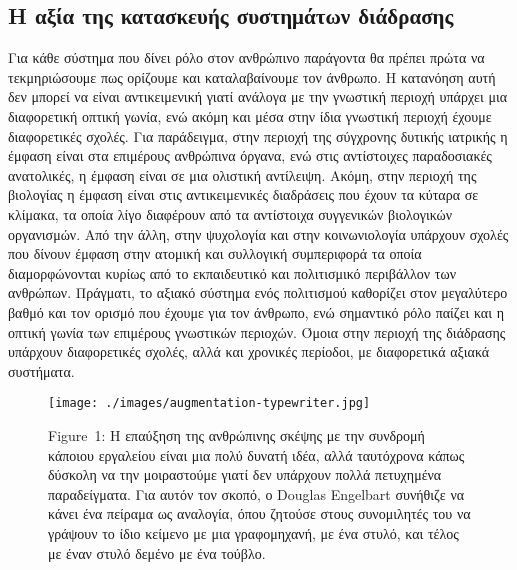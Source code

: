 \documentclass[
]{article}
\begin{document}
\hypertarget{ux3b7-ux3b1ux3beux3afux3b1-ux3c4ux3b7ux3c2-ux3baux3b1ux3c4ux3b1ux3c3ux3baux3b5ux3c5ux3aeux3c2-ux3c3ux3c5ux3c3ux3c4ux3b7ux3bcux3acux3c4ux3c9ux3bd-ux3b4ux3b9ux3acux3b4ux3c1ux3b1ux3c3ux3b7ux3c2}{%
\subsection{Η αξία της κατασκευής συστημάτων
διάδρασης}\label{ux3b7-ux3b1ux3beux3afux3b1-ux3c4ux3b7ux3c2-ux3baux3b1ux3c4ux3b1ux3c3ux3baux3b5ux3c5ux3aeux3c2-ux3c3ux3c5ux3c3ux3c4ux3b7ux3bcux3acux3c4ux3c9ux3bd-ux3b4ux3b9ux3acux3b4ux3c1ux3b1ux3c3ux3b7ux3c2}}

Για κάθε σύστημα που δίνει ρόλο στον ανθρώπινο παράγοντα θα πρέπει πρώτα
να τεκμηριώσουμε πως ορίζουμε και καταλαβαίνουμε τον άνθρωπο. Η
κατανόηση αυτή δεν μπορεί να είναι αντικειμενική γιατί ανάλογα με την
γνωστική περιοχή υπάρχει μια διαφορετική οπτική γωνία, ενώ ακόμη και
μέσα στην ίδια γνωστική περιοχή έχουμε διαφορετικές σχολές. Για
παράδειγμα, στην περιοχή της σύγχρονης δυτικής ιατρικής η έμφαση είναι
στα επιμέρους ανθρώπινα όργανα, ενώ στις αντίστοιχες παραδοσιακές
ανατολικές, η έμφαση είναι σε μια ολιστική αντίλειψη. Ακόμη, στην
περιοχή της βιολογίας η έμφαση είναι στις αντικειμενικές διαδράσεις που
έχουν τα κύταρα σε κλίμακα, τα οποία λίγο διαφέρουν από τα αντίστοιχα
συγγενικών βιολογικών οργανισμών. Από την άλλη, στην ψυχολογία και στην
κοινωνιολογία υπάρχουν σχολές που δίνουν έμφαση στην ατομική και
συλλογική συμπεριφορά τα οποία διαμορφώνονται κυρίως από το εκπαιδευτικό
και πολιτισμικό περιβάλλον των ανθρώπων. Πράγματι, το αξιακό σύστημα
ενός πολιτισμού καθορίζει στον μεγαλύτερο βαθμό και τον ορισμό που
έχουμε για τον άνθρωπο, ενώ σημαντικό ρόλο παίζει και η οπτική γωνία των
επιμέρους γνωστικών περιοχών. Όμοια στην περιοχή της διάδρασης υπάρχουν
διαφορετικές σχολές, αλλά και χρονικές περίοδοι, με διαφορετικά αξιακά
συστήματα.

\leavevmode{}%
\begin{figure}
\hypertarget{fig:augmentation-typewriter}{%
\centering
\texttt{[image: ./images/augmentation-typewriter.jpg]}
\caption{Figure~1: Η επαύξηση της ανθρώπινης σκέψης με την συνδρομή
κάποιου εργαλείου είναι μια πολύ δυνατή ιδέα, αλλά ταυτόχρονα κάπως
δύσκολη να την μοιραστούμε γιατί δεν υπάρχουν πολλά πετυχημένα
παραδείγματα. Για αυτόν τον σκοπό, ο Douglas Engelbart συνήθιζε να κάνει
ένα πείραμα ως αναλογία, όπου ζητούσε στους συνομιλητές του να γράψουν
το ίδιο κείμενο με μια γραφομηχανή, με ένα στυλό, και τέλος με έναν
στυλό δεμένο με ένα τούβλο.}\label{fig:augmentation-typewriter}
}
\end{figure}
\end{document}
